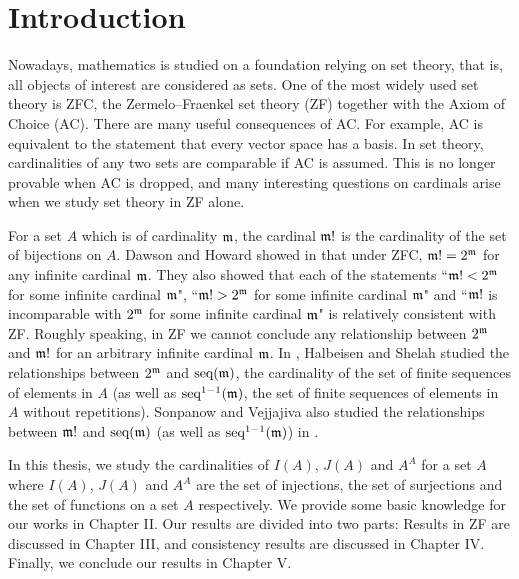 \chapter{Introduction}

Nowadays, mathematics is studied on a foundation relying on set theory, that is, all objects of interest are considered as sets. One of the most widely used set theory is ZFC, the Zermelo–Fraenkel set theory (ZF) together with the Axiom of Choice (AC). There are many useful consequences of AC. For example, AC is equivalent to the statement that every vector space has a basis. In set theory, cardinalities of any two sets are comparable if AC is assumed. This is no longer provable when AC is dropped, and many interesting questions on cardinals arise when we study set theory in ZF alone. 

For a set $A$ which is of cardinality $\frak{m}$, the cardinal $\frak{m}!$ is the cardinality of the set of bijections on $A$. Dawson and Howard showed in \cite{DH} that under ZFC, $\frak{m}!=2^{\frak{m}}$ for any infinite cardinal $\frak{m}$. They also showed that each of the statements ``$\frak{m}!<2^{\frak{m}}$ for some infinite cardinal $\frak{m}$", ``$\frak{m}!>2^{\frak{m}}$ for some infinite cardinal $\frak{m}$" and ``$\frak{m}!$ is incomparable with $2^{\frak{m}}$ for some infinite cardinal $\frak{m}$" is relatively consistent with ZF. Roughly speaking, in ZF we cannot conclude any relationship between $2^{\frak{m}}$ and $\frak{m}!$ for an arbitrary infinite cardinal $\frak{m}$.
In \cite{HalSheCon}, Halbeisen and Shelah studied the relationships between $2^{\frak{m}}$ and $\seq(\frak{m})$, the cardinality of the set of finite sequences of elements in $A$ (as well as $\seq^{1-1}(\frak{m})$, the set of finite sequences of elements in $A$ without repetitions). Sonpanow and Vejjajiva also studied the relationships between $\frak{m}!$ and $\seq(\frak{m})$ (as well as $\seq^{1-1}(\frak{m})$) in \cite{SonVej2019}.

In this thesis, we study the cardinalities of $I(A)$, $J(A)$ and $A^{A}$ for a set $A$ where $I(A)$, $J(A)$ and $A^{A}$ are the set of injections, the set of surjections and the set of functions on a set $A$ respectively. We provide some basic knowledge for our works in Chapter II. Our results are divided into two parts: Results in ZF are discussed in Chapter III, and consistency results are discussed in Chapter IV. Finally, we conclude our results in Chapter V.
